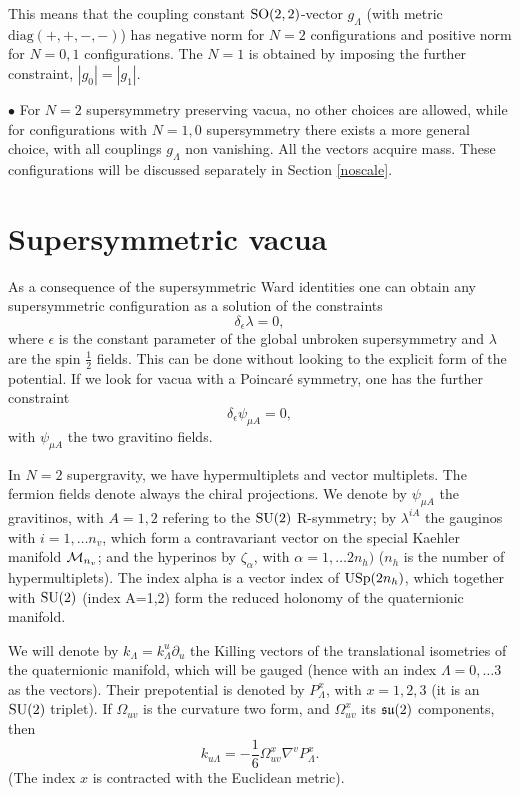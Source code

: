\documentclass[a4paper,12pt]{article}
\begin{document}
\bigskip

\noindent This means that  the coupling constant
$\mathrm{SO}(2,2)$-vector $g_\Lambda$ (with metric\\
$\mathrm{diag}(+,+,-,-)$) has negative norm for $N=2$
configurations and positive norm  for $N=0,1$ configurations. The
$N=1$ is obtained by imposing the further constraint,
$|g_0|=|g_1|.$


\bigskip

\noindent $\bullet$ For $N=2$ supersymmetry preserving vacua, no
other choices are allowed, while for configurations with $N=1,0$
supersymmetry there exists a more general choice, with all
couplings $g_\Lambda$ non vanishing. All the vectors acquire mass.
These configurations will be discussed separately in Section
\ref{noscale}.




\section{Supersymmetric vacua}
As a consequence of the supersymmetric Ward identities \cite{df}
one can obtain any supersymmetric configuration as a solution of
the constraints
$$\delta_{\epsilon}\lambda=0,$$
where $\epsilon$ is the constant parameter of the global unbroken
supersymmetry and $\lambda$ are the spin $\frac 1 2$ fields. This
can be done without looking to the explicit form of the potential.
If we look for vacua with a Poincar\'e symmetry, one has the
further constraint
$$\delta_{\epsilon}\psi_{\mu A}=0,$$
with $\psi_{\mu A}$ the two gravitino fields.

In $N=2$ supergravity, we have hypermultiplets and vector
multiplets. The fermion fields denote always the chiral
projections. We denote by $\psi_{\mu A}$ the gravitinos, with
$A=1,2$ refering to the $\mathrm{SU}(2)$ R-symmetry; by $\lambda^{iA}$
the gauginos with $i=1, \dots n_v$, which form a contravariant
vector on the special Kaehler manifold $\mathcal{M}_{n_v}$; and the
hyperinos by $\zeta_\alpha$, with $\alpha=1, \dots 2n_h)$ ($n_h$
is the number of hypermultiplets). The index alpha is a vector
index
 of $\mathrm{USp}(2n_h)$, which together with $\mathrm{SU}(2)$ (index A=1,2)
form the reduced holonomy of the quaternionic manifold.


 We will denote   by $k_\Lambda=k_\Lambda^u\partial_u$  the  Killing
vectors of the translational isometries of  the
 quaternionic manifold, which will be gauged (hence with an index $\Lambda=0,\dots 3$ as the vectors).
  Their  prepotential  is denoted by  $P_\Lambda^x$, with $x=1,2,3$ (it  is an $\mathrm{SU}(2)$ triplet).
  If $\Omega_{uv}$ is the
curvature two form, and $\Omega^x_{uv}$ its $\mathfrak{su}(2)$ components,
then
$$k_{u\Lambda}=-\frac{1}6\Omega^x_{uv}\nabla^vP_\Lambda^x.$$
(The index $x$ is contracted with the Euclidean metric).
\end{document}
